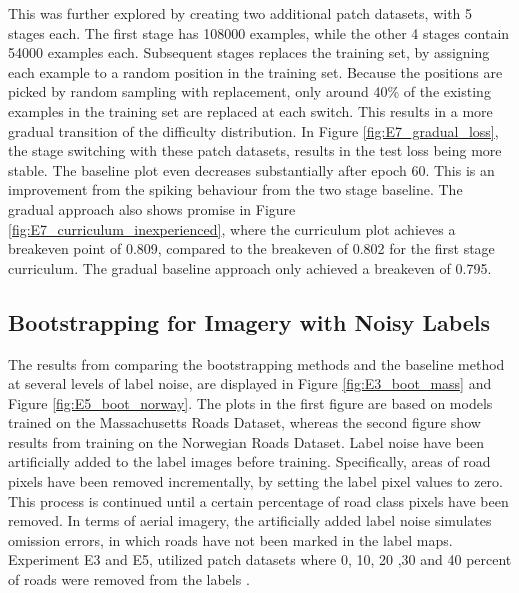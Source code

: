 This was further explored by creating two additional patch datasets, with 5 stages each. The first stage has 108000 examples, while the other 4 stages contain 54000 examples each. Subsequent stages replaces the training set, by assigning each example to a random position in the training set. Because the positions are picked by random sampling with replacement, only around 40\% of the existing examples in the training set are replaced at each switch. This results in a more gradual transition of the difficulty distribution. In Figure \ref{fig:E7_gradual_loss}, the stage switching with these patch datasets, results in the test loss being more stable.
The baseline plot even decreases substantially after epoch 60. This is an improvement from the spiking behaviour from the two stage baseline. The gradual approach also shows promise in Figure \ref{fig:E7_curriculum_inexperienced}, where the curriculum plot achieves a breakeven point of 0.809, compared to the breakeven of 0.802 for the first stage curriculum. The gradual baseline approach only achieved a breakeven of 0.795.\\

\subsection{Bootstrapping for Imagery with Noisy Labels}
\label{sec:results_bootstrapping}

The results from comparing the bootstrapping methods and the baseline method at several levels of label noise, are displayed in Figure \ref{fig:E3_boot_mass} and Figure \ref{fig:E5_boot_norway}. The plots in the first figure are based on models trained on the Massachusetts Roads Dataset, whereas the second figure show results from training on the Norwegian Roads Dataset. Label noise have been artificially added to the label images before training. Specifically, areas of road pixels have been removed incrementally, by setting the label pixel values to zero. This process is continued until a certain percentage of road class pixels have been removed. In terms of aerial imagery, the artificially added label noise simulates omission errors, in which roads have not been marked in the label maps. Experiment E3 and E5, utilized patch datasets where 0, 10, 20 ,30 and 40 percent of roads were removed from the labels .\\

